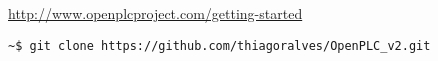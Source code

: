 \pagebreak{}

\url{http://www.openplcproject.com/getting-started}

\begin{lstlisting}
~$ git clone https://github.com/thiagoralves/OpenPLC_v2.git
\end{lstlisting}